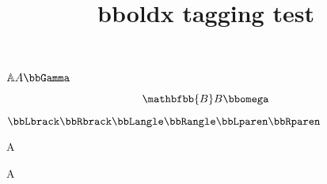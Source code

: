 \documentclass{article}
\title{bboldx tagging test}
\begin{document}
$\mathbb{A}A\bbGamma$

\[\mathbfbb{B}B\bbomega\]

$
\bbLbrack
\bbRbrack
\bbLangle
\bbRangle
\bbLparen
\bbRparen
$

A

A
\end{document}
